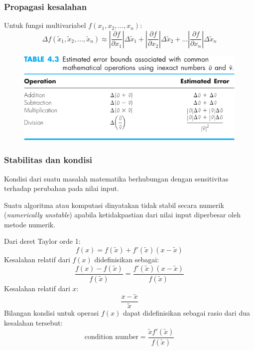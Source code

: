 \documentclass[9pt]{beamer}
\begin{document}
\begin{frame}
\frametitle{Propagasi kesalahan}

Untuk fungsi multivariabel $f(x_{1},x_{2}, \ldots, x_{n})$:
\begin{equation}
\Delta f(\tilde{x}_{1}, \tilde{x}_{2}, \ldots, \tilde{x}_{n})
\approx
\left|\frac{\partial f}{\partial x_{1}} \right| \Delta\tilde{x}_{1} +
\left|\frac{\partial f}{\partial x_{2}} \right| \Delta\tilde{x}_{2} + \ldots
\left|\frac{\partial f}{\partial x_{n}} \right| \Delta\tilde{x}_{n}
\end{equation}

\begin{figure}[H]
{\center
\includegraphics[width=\textwidth]{images/Chapra_table_4_3.pdf}
\par}
\end{figure}

\end{frame}


\begin{frame}
\frametitle{Stabilitas dan kondisi}

Kondisi dari suatu masalah matematika berhubungan dengan sensitivitas terhadap
perubahan pada nilai input.

Suatu algoritma atau komputasi dinyatakan tidak stabil secara numerik
(\textit{numerically unstable}) apabila ketidakpastian dari nilai input diperbesar
oleh metode numerik.

Dari deret Taylor orde 1:
\begin{equation}
f(x) = f(\tilde{x}) + f'(\tilde{x})(x - \tilde{x})
\end{equation}
Kesalahan relatif dari $f(x)$ didefinisikan sebagai:
\begin{equation}
\frac{f(x) - f(\tilde{x})}{f(\tilde{x})} = \frac{ f'(\tilde{x})(x - \tilde{x})}{f(\tilde{x})}
\end{equation}
Kesalahan relatif dari $x$:
\begin{equation}
\frac{x - \tilde{x}}{\tilde{x}}
\end{equation}
Bilangan kondisi untuk operasi $f(x)$ dapat didefinisikan sebagai rasio dari dua kesalahan tersebut:
\begin{equation}
\text{condition number} = \frac{\tilde{x} f'(\tilde{x})}{f(\tilde{x})}
\end{equation}


\end{frame}
\end{document}
